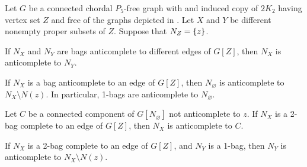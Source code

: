 \begin{lemma}
    Let $G$ be a connected chordal $P_5$-free graph with and induced copy of
    $2K_2$ having vertex set $Z$ and free of the graphs depicted in
    . Let $X$ and $Y$ be different
    nonempty proper subsets of $Z$. Suppose that $N_Z=\left\{z\right\}$.
    \begin{lemenum}
        \item If $N_X$ and $N_Y$ are bags anticomplete to different edges
            of $G[Z]$, then $N_X$ is anticomplete to $N_Y$.
            \label{lem:chordal_anti_3}
        \item If $N_X$ is a bag anticomplete to an edge of $G[Z]$, then
            $N_\varnothing$ is anticomplete to $N_X \setminus N(z)$. In
            particular, 1-bags are anticomplete to $N_\varnothing$.
            \label{lem:chordal_anti_5}
        \item Let $C$ be a connected component of $G[N_\varnothing]$ not
            anticomplete to $z$. If $N_X$ is a 2-bag complete to an edge of
            $G[Z]$, then $N_X$ is anticomplete to $C$.
            \label{lem:chordal_anti_2_bag}
        \item If $N_X$ is a 2-bag complete to an edge of $G[Z]$, and $N_Y$ is a
            1-bag, then $N_Y$ is anticomplete to $N_X \setminus N(z)$.
            \label{lem:chordal_anti_2_bag_2}
    \end{lemenum}
\end{lemma}

